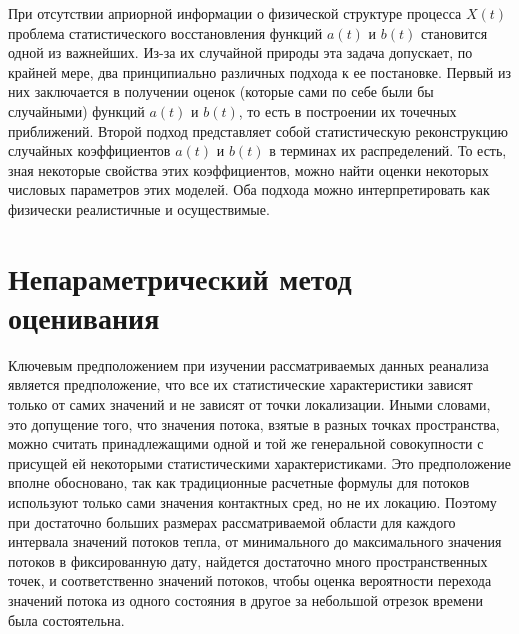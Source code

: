 При отсутствии априорной информации о физической структуре процесса $X(t)$ проблема статистического восстановления функций $a(t)$ и $b(t)$ становится одной из важнейших. Из-за их случайной природы эта задача допускает, по крайней мере, два принципиально различных подхода к ее постановке. Первый из них заключается в получении оценок (которые сами по себе были бы случайными) функций $a(t)$ и $b(t)$, то есть в построении их точечных приближений. Второй подход представляет собой статистическую реконструкцию случайных коэффициентов $a(t)$ и $b(t)$ в терминах их распределений. То есть, зная некоторые свойства этих коэффициентов, можно найти оценки некоторых числовых параметров этих моделей. Оба подхода можно интерпретировать как физически реалистичные и осуществимые.

\section{Непараметрический метод оценивания}
\label{sec:Nonparametic}
Ключевым предположением при изучении рассматриваемых данных реанализа является предположение, что все их статистические характеристики зависят только от самих значений и не зависят от точки локализации. Иными словами, это допущение того, что значения потока, взятые в разных точках пространства, можно считать принадлежащими одной и той же генеральной совокупности с присущей ей некоторыми статистическими характеристиками. Это предположение вполне обосновано, так как традиционные расчетные формулы для потоков~\cite{cronin2019air,leyba2019trends} используют только сами значения контактных сред, но не их локацию. Поэтому при достаточно больших размерах рассматриваемой области для каждого интервала значений потоков тепла, от минимального до максимального значения потоков в фиксированную дату, найдется достаточно много пространственных точек, и соответственно значений потоков, чтобы оценка вероятности перехода значений потока из одного состояния в другое за небольшой отрезок времени была состоятельна.


